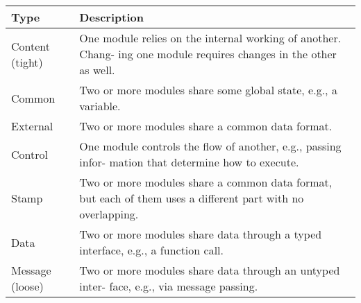\centering
\begin{tabular}{|l|p{2.5in}|}
\hline
\bfseries Type & \bfseries Description\\
\hline
Content (tight) & One module relies on the internal working of another. Chang- ing one module requires changes in the other as well.\\
\hline
Common & Two or more modules share some global state, e.g., a variable.\\
\hline
External & Two or more modules share a common data format.\\
\hline
Control & One module controls the flow of another, e.g., passing infor- mation that determine how to execute.\\
\hline
Stamp & Two or more modules share a common data format, but each of them uses a different part with no overlapping.\\
\hline
Data & Two or more modules share data through a typed interface, e.g., a function call.\\
\hline
Message (loose) & Two or more modules share data through an untyped inter- face, e.g., via message passing.\\
\hline
\end{tabular}